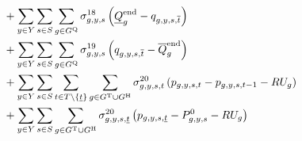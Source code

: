 \documentclass{article}
\begin{document}
\begin{align}
		& + \sum\limits_{\iYear \in \sYears}\sum\limits_{\iScenario \in \sScenarios} \sum\limits_{\iGenerator \in \sStorage} \dMinStorageEnergyIntervalEnd \left(\cStorageUnitEnergyIntervalEndMin - \vStorageUnitEnergy[\iGenerator,\iYear,\iScenario,\iIntervalTerminal]\right)\\
		& + \sum\limits_{\iYear \in \sYears}\sum\limits_{\iScenario \in \sScenarios} \sum\limits_{\iGenerator \in \sStorage} \dMaxStorageEnergyIntervalEnd \left(\vStorageUnitEnergy[\iGenerator,\iYear,\iScenario,\iIntervalTerminal] - \cStorageUnitEnergyIntervalEndMax\right)\\
		& + \sum\limits_{\iYear \in \sYears}\sum\limits_{\iScenario \in \sScenarios}\sum\limits_{\iInterval \in \sIntervals \setminus \{\iIntervalStart\}} \sum\limits_{\iGenerator \in \sGeneratorsThermal \cup \sGeneratorsHydro} \dRampRateUp \left(\vPower - \vPower[\iGenerator,\iYear,\iScenario,\iInterval-1] - \cRampRateUp\right)\\
		& + \sum\limits_{\iYear \in \sYears}\sum\limits_{\iScenario \in \sScenarios} \sum\limits_{\iGenerator \in \sGeneratorsThermal \cup \sGeneratorsHydro} \dRampRateUp[\iGenerator,\iYear,\iScenario,\iIntervalStart] \left(\vPower[\iGenerator,\iYear,\iScenario,\iIntervalStart] - \cPowerInitial - \cRampRateUp\right)\\

\end{align}
\end{document}
